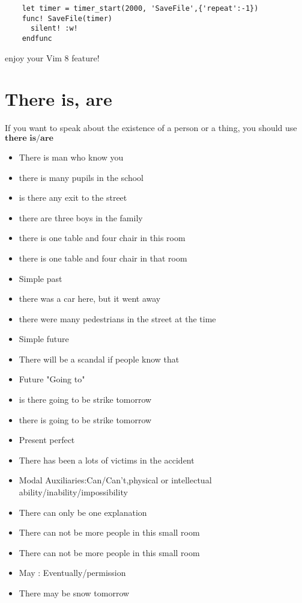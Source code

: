 \documentclass{article}
\begin{document}
\begin{verbatim}
    let timer = timer_start(2000, 'SaveFile',{'repeat':-1})
    func! SaveFile(timer)
      silent! :w!
    endfunc
\end{verbatim} 

enjoy your Vim 8 feature!

\pagebreak
\section{There is, are}
If you want to speak about the existence of a person or a thing, you should use 
$\textbf{there is/are}$

\begin{itemize}
\item[] There is man who know you 
\item[] there is many pupils in the school  
\item[] is there any exit to the street    
\item[] there are three boys in the family   
\item[] there is one table and four chair in this room  
\item[] there is one table and four chair in that room  
\item Simple past  
\item[] there was a car here, but it went away 
\item[] there were many pedestrians in the street at the time
\item Simple future
\item[] There will be a scandal if people know that
\item Future "Going to" 
\item[] is there going to be strike tomorrow
\item[] there is going to be strike tomorrow 
\item Present perfect
\item[] There has been a lots of victims in the accident
\item Modal Auxiliaries:Can/Can't,physical or intellectual ability/inability/impossibility
\item[] There can only be one explanation
\item[] There can not be more people in this small room
\item[] There can not be more people in this small room
\item May : Eventually/permission
\item[] There may be snow tomorrow

\end{itemize}
\end{document}
